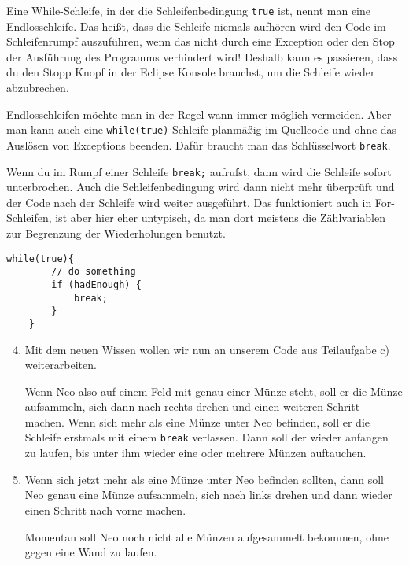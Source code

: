\begin{Infobox}
	Eine While-Schleife, in der die Schleifenbedingung \lstinline{true} ist, nennt man eine Endlosschleife.
	Das heißt, dass die Schleife niemals aufhören wird den Code im Schleifenrumpf auszuführen, wenn das nicht durch eine Exception oder den Stop der Ausführung des Programms verhindert wird!
	Deshalb kann es passieren, dass du den Stopp Knopf in der Eclipse Konsole brauchst, um die Schleife wieder abzubrechen.\newline

	Endlosschleifen möchte man in der Regel wann immer möglich vermeiden.
	Aber man kann auch eine \lstinline{while(true)}-Schleife planmäßig im Quellcode und ohne das Auslösen von Exceptions beenden.
	Dafür braucht man das Schlüsselwort \lstinline{break}.\newline

	Wenn du im Rumpf einer Schleife \lstinline{break;} aufrufst, dann wird die Schleife sofort unterbrochen.
	Auch die Schleifenbedingung wird dann nicht mehr überprüft und der Code nach der Schleife wird weiter ausgeführt.
	Das funktioniert auch in For-Schleifen, ist aber hier eher untypisch, da man dort meistens die Zählvariablen zur Begrenzung der Wiederholungen benutzt.

	\begin{lstlisting}[numbers=none]
	while(true){
		// do something
		if (hadEnough) {
			break;
		}
	}
	\end{lstlisting}

\end{Infobox}


\begin{enumerate}\setcounter{enumi}{3}
	\item
	Mit dem neuen Wissen wollen wir nun an unserem Code aus Teilaufgabe c) weiterarbeiten.

	Wenn Neo also auf einem Feld mit genau einer Münze steht, soll er die Münze aufsammeln, sich dann nach rechts drehen und einen weiteren Schritt machen.
	Wenn sich mehr als eine Münze unter Neo befinden, soll er die Schleife erstmals mit einem \lstinline{break} verlassen.
	Dann soll der wieder anfangen zu laufen, bis unter ihm wieder eine oder mehrere Münzen auftauchen.
	
	\item
	Wenn sich jetzt mehr als eine Münze unter Neo befinden sollten, dann soll Neo genau eine Münze aufsammeln, sich nach links drehen und dann wieder einen Schritt nach vorne machen.
	
	Momentan soll Neo noch nicht alle Münzen aufgesammelt bekommen, ohne gegen eine Wand zu laufen.
	\end{enumerate}
	

